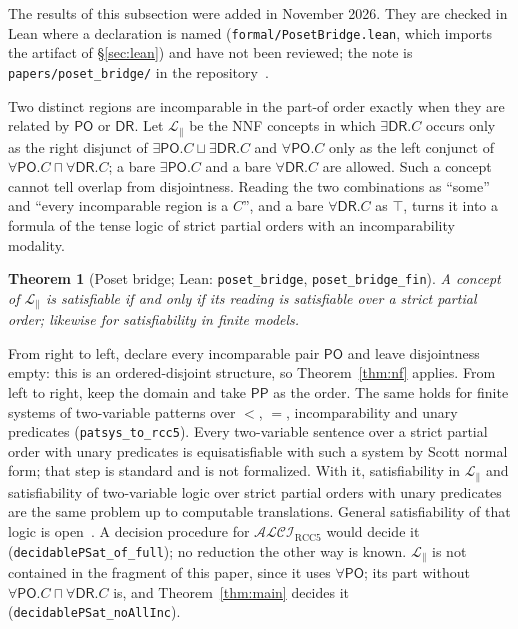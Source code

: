 \documentclass[11pt]{article}
\newcommand{\ALCIRCC}[1]{\mathcal{ALCI}_{\mathrm{RCC#1}}}
\newcommand{\DR}{\mathsf{DR}}
\newcommand{\PO}{\mathsf{PO}}
\newcommand{\PP}{\mathsf{PP}}
\newcommand{\code}[1]{\texttt{#1}}
\theoremstyle{plain}
\newtheorem{theorem}{Theorem}[section]
\theoremstyle{definition}
\begin{document}
The results of this subsection were added in November 2026. They are checked
in Lean where a declaration is named (\texttt{formal/PosetBridge.lean}, which
imports the artifact of \S\ref{sec:lean}) and have not been reviewed; the note
is \texttt{papers/poset\_bridge/} in the repository~\cite{Artifact}.

Two distinct regions are incomparable in the part-of order exactly when they
are related by $\PO$ or $\DR$. Let $\mathcal L_{\parallel}$ be the NNF concepts
in which $\exists\DR.C$ occurs only as the right disjunct of
$\exists\PO.C\sqcup\exists\DR.C$ and $\forall\PO.C$ only as the left conjunct
of $\forall\PO.C\sqcap\forall\DR.C$; a bare $\exists\PO.C$ and a bare
$\forall\DR.C$ are allowed. Such a concept cannot tell overlap from
disjointness. Reading the two combinations as ``some'' and ``every incomparable
region is a $C$'', and a bare $\forall\DR.C$ as $\top$, turns it into a formula
of the tense logic of strict partial orders with an incomparability modality.

\begin{theorem}[Poset bridge; Lean: \code{poset\_bridge},
\code{poset\_bridge\_fin}]\label{thm:bridge}
A concept of $\mathcal L_{\parallel}$ is satisfiable if and only if its reading
is satisfiable over a strict partial order; likewise for satisfiability in
finite models.
\end{theorem}

From right to left, declare every incomparable pair $\PO$ and leave
disjointness empty: this is an ordered-disjoint structure, so
Theorem~\ref{thm:nf} applies. From left to right, keep the domain and take
$\PP$ as the order. The same holds for finite systems of two-variable patterns
over $<$, $=$, incomparability and unary predicates (\code{patsys\_to\_rcc5}).
Every two-variable sentence over a strict partial order with unary predicates
is equisatisfiable with such a system by Scott normal form; that step is
standard and is not formalized. With it, satisfiability in
$\mathcal L_{\parallel}$ and satisfiability of two-variable logic over strict
partial orders with unary predicates are the same problem up to computable
translations. General satisfiability of that logic is
open~\cite{MarzecTendera2026}. A decision procedure for $\ALCIRCC{5}$ would
decide it (\code{decidablePSat\_of\_full}); no reduction the other way is
known. $\mathcal L_{\parallel}$ is not contained in the fragment
of this paper, since it uses $\forall\PO$; its part without
$\forall\PO.C\sqcap\forall\DR.C$ is, and Theorem~\ref{thm:main} decides it
(\code{decidablePSat\_noAllInc}).
\end{document}
